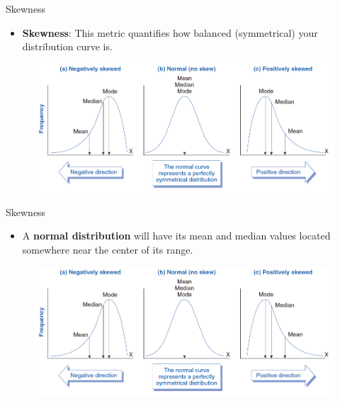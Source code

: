 \documentclass[
  ignorenonframetext,
]{beamer}
\providecommand{\tightlist}{%
  \setlength{\itemsep}{0pt}\setlength{\parskip}{0pt}}
\begin{document}
\begin{frame}{Skewness}
\label{skewness}
\begin{itemize}
\tightlist
\item
  \textbf{Skewness}: This metric quantifies how balanced (symmetrical)
  your distribution curve is.
\end{itemize}

\begin{figure}
\includegraphics[width=0.8\linewidth]{fig/skewness} \end{figure}
\end{frame}

\begin{frame}{Skewness}
\label{skewness-1}
\begin{itemize}
\tightlist
\item
  A \textbf{normal distribution} will have its mean and median values
  located somewhere near the center of its range.
\end{itemize}

\begin{figure}
\includegraphics[width=0.8\linewidth]{fig/skewness} \end{figure}
\end{frame}
\end{document}
